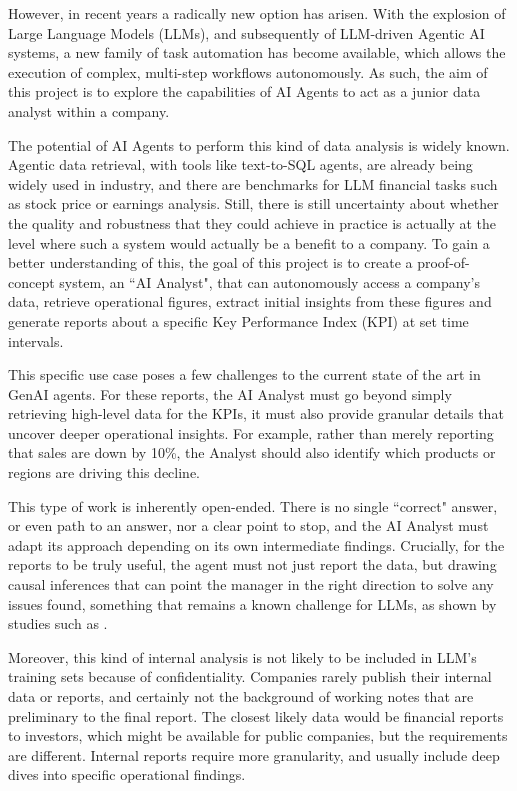 \documentclass[a4paper]{report}
\begin{document}
However, in recent years a radically new option has arisen. With the explosion of Large Language Models (LLMs), and subsequently of LLM-driven Agentic AI systems, a new family of task automation has become available, which allows the execution of complex, multi-step workflows autonomously. As such, the aim of this project is to explore the capabilities of AI Agents to act as a junior data analyst within a company.

The potential of AI Agents to perform this kind of data analysis is widely known. Agentic data retrieval, with tools like text-to-SQL agents, are already being widely used in industry, and there are benchmarks for LLM financial tasks such as stock price or earnings analysis. Still, there is still uncertainty about whether the quality and robustness that they could achieve in practice is actually at the level where such a system would actually be a benefit to a company. To gain a better understanding of this, the goal of this project is to create a proof-of-concept system, an ``AI Analyst", that can autonomously access a company's data, retrieve operational figures, extract initial insights from these figures and generate reports about a specific Key Performance Index (KPI) at set time intervals.

This specific use case poses a few challenges to the current state of the art in GenAI agents. For these reports, the AI Analyst must go beyond simply retrieving high-level data for the KPIs, it must also provide granular details that uncover deeper operational insights. For example, rather than merely reporting that sales are down by 10\%, the Analyst should also identify which products or regions are driving this decline.

This type of work is inherently open-ended. There is no single ``correct" answer, or even path to an answer, nor a clear point to stop, and the AI Analyst must adapt its approach depending on its own intermediate findings. Crucially, for the reports to be truly useful, the agent must not just report the data, but drawing causal inferences that can point the manager in the right direction to solve any issues found, something that remains a known challenge for LLMs, as shown by studies such as \cite{llmcausalreasoning2024}.

Moreover, this kind of internal analysis is not likely to be included in LLM's training sets because of confidentiality. Companies rarely publish their internal data or reports, and certainly not the background of working notes that are preliminary to the final report. The closest likely data would be financial reports to investors, which might be available for public companies, but the requirements are different. Internal reports require more granularity, and usually include deep dives into specific operational findings.
\end{document}
